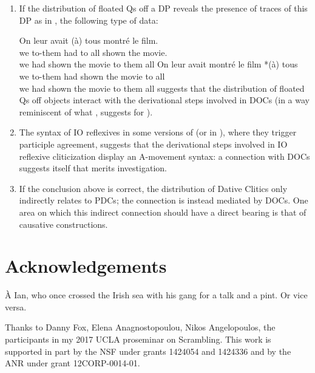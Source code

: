 \documentclass[output=paper]{langsci/langscibook}
\begin{document}
\begin{enumerate}
\item If the distribution of floated Qs off a DP reveals the presence of traces
    of this DP as in  \cite{Sportiche:1988}, the following type of data:

\ea
\ea
	\gll  On leur avait  (\`a) tous montr\'e le film.\\
    we to-them had to all shown the movie.\\
    \trans we had shown the movie to them all
\ex
	\gll On leur avait montré le film *(\`a) tous\\
    we to-them had  shown the movie to all\\
    \trans we had shown the movie to them all
\z
\z
%
suggests that the distribution of floated Qs off objects interact with the
derivational steps involved in \glspl{DOC} (in a way reminiscent of what
\citealp{Sportiche2017c}, suggests for ).

\item The syntax of IO reflexives in some versions of  (or in ),
    where they trigger participle agreement, suggests that the derivational
    steps involved in IO reflexive cliticization display an A-movement syntax:
    a connection with  \glspl{DOC} suggests itself that merits
    investigation.

\item If the conclusion above is correct, the distribution of  Dative
    Clitics only indirectly relates to \glspl{PDC}; the connection
    is instead mediated by \glspl{DOC}. One area on which this indirect
    connection should have a direct bearing is that of causative constructions.

\end{enumerate}

\printchapterglossary{}

\section*{Acknowledgements}

\`A Ian, who once crossed the Irish sea with his gang for a talk and a pint. Or
vice versa.

Thanks to Danny Fox, Elena Anagnostopoulou, Nikos Angelopoulos, the
participants in my 2017 UCLA proseminar on Scrambling. This work is supported
in part by the NSF under grants 1424054 and 1424336 and by the ANR under grant
12CORP-0014-01.

{\sloppy
\printbibliography[heading=subbibliography,notkeyword=this]
}
\end{document}
